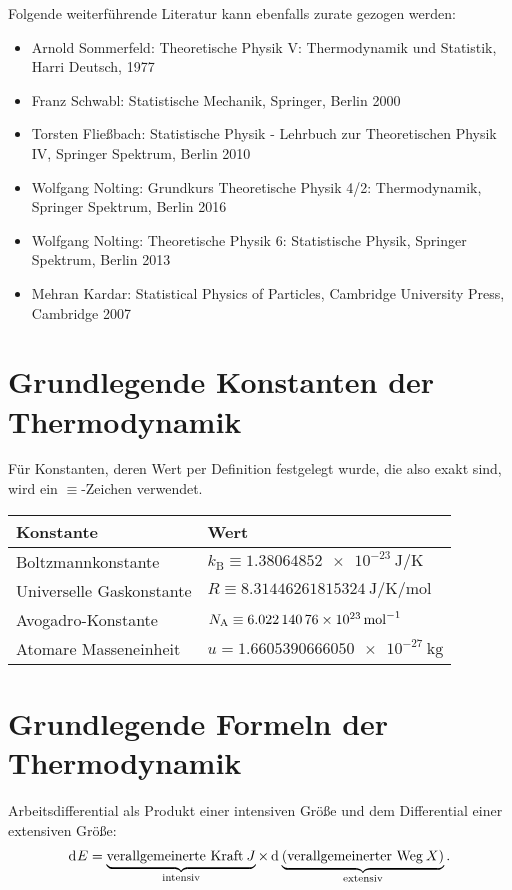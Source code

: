 Folgende weiterführende Literatur kann ebenfalls zurate gezogen werden:
\begin{itemize}
	\item Arnold Sommerfeld: Theoretische Physik V: Thermodynamik und Statistik, Harri Deutsch, 1977
	\item Franz Schwabl: Statistische Mechanik, Springer, Berlin 2000
	\item Torsten Fließbach: Statistische Physik - Lehrbuch zur Theoretischen Physik IV, Springer Spektrum, Berlin 2010
	\item Wolfgang Nolting: Grundkurs Theoretische Physik 4/2: Thermodynamik, Springer Spektrum, Berlin 2016
	\item Wolfgang Nolting: Theoretische Physik 6: Statistische Physik, Springer Spektrum, Berlin 2013
	\item Mehran Kardar: Statistical Physics of Particles, Cambridge University Press, Cambridge 2007
\end{itemize}



\section*{Grundlegende Konstanten der Thermodynamik}

Für Konstanten, deren Wert per Definition festgelegt wurde, die also exakt sind, wird ein $\equiv $-Zeichen verwendet.


\begin{table}[H]
	\centering
	\begin{tabular}{|l|l|} \hline
		\textbf{Konstante}       & \textbf{Wert}                                                                            \\
		\hline

		Boltzmannkonstante       & \centering\arraybackslash{} $k_\mathrm{B} \equiv \qty{1,38064852e-23}{\joule\per\kelvin}$ \\
		Universelle Gaskonstante & \centering\arraybackslash{} $R \equiv \qty{8,31446261815324}{\joule\per\kelvin\per\mole}$ \\
		Avogadro-Konstante        & \centering\arraybackslash{} $N_\mathrm{A} \equiv \qty{6,02214076e23}{\per\mole}$          \\
		Atomare Masseneinheit    & \centering\arraybackslash{} $u= \qty{1,6605390666050e-27}{\kg}$                           \\
		\hline
	\end{tabular}
\end{table}




\section*{Grundlegende Formeln der Thermodynamik}

Arbeitsdifferential als Produkt einer intensiven Größe und dem Differential einer extensiven Größe:
\begin{align*}
    \mathop{\mathrm{d}^{}E} = \underbrace{\text{verallgemeinerte Kraft}\: J}_{\text{intensiv}} \times \mathop{\mathrm{d}^{}\underbrace{(\text{verallgemeinerter Weg}\: X)}_{\text{extensiv}}}.
\end{align*}
